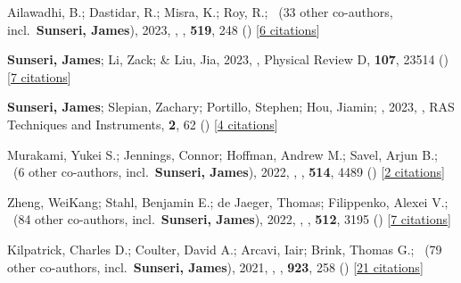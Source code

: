 \item Ailawadhi, B.; Dastidar, R.; Misra, K.; Roy, R.; \etal\ ({33} other co-authors, incl.\ \textbf{Sunseri, James}), 2023, , \mnras, \textbf{519}, 248 () [\href{https://ui.adsabs.harvard.edu/abs/2023MNRAS.519..248A}{6 citations}]

\item \textbf{Sunseri, James}; Li, Zack; \& Liu, Jia, 2023, , Physical Review D, \textbf{107}, 23514 () [\href{https://ui.adsabs.harvard.edu/abs/2023PhRvD.107b3514S}{7 citations}]

\item \textbf{Sunseri, James}; Slepian, Zachary; Portillo, Stephen; Hou, Jiamin; \etal, 2023, , RAS Techniques and Instruments, \textbf{2}, 62 () [\href{https://ui.adsabs.harvard.edu/abs/2023RASTI...2...62S}{4 citations}]

\item Murakami, Yukei S.; Jennings, Connor; Hoffman, Andrew M.; Savel, Arjun B.; \etal\ ({6} other co-authors, incl.\ \textbf{Sunseri, James}), 2022, , \mnras, \textbf{514}, 4489 () [\href{https://ui.adsabs.harvard.edu/abs/2022MNRAS.514.4489M}{2 citations}]

\item Zheng, WeiKang; Stahl, Benjamin E.; de Jaeger, Thomas; Filippenko, Alexei V.; \etal\ ({84} other co-authors, incl.\ \textbf{Sunseri, James}), 2022, , \mnras, \textbf{512}, 3195 () [\href{https://ui.adsabs.harvard.edu/abs/2022MNRAS.512.3195Z}{7 citations}]

\item Kilpatrick, Charles D.; Coulter, David A.; Arcavi, Iair; Brink, Thomas G.; \etal\ ({79} other co-authors, incl.\ \textbf{Sunseri, James}), 2021, , \apj, \textbf{923}, 258 () [\href{https://ui.adsabs.harvard.edu/abs/2021ApJ...923..258K}{21 citations}]